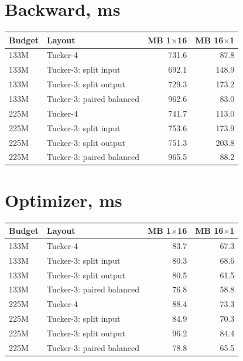 \documentclass[10pt]{article}
\begin{document}
\section{Backward, ms}
\begin{center}
\small
\begin{tabular}{llrr}
\toprule
\textbf{Budget} & \textbf{Layout} & \textbf{MB 1$\times$16} & \textbf{MB 16$\times$1} \\
\midrule
133M & Tucker-4 & 731.6 & 87.8 \\
133M & Tucker-3: split input & 692.1 & 148.9 \\
133M & Tucker-3: split output & 729.3 & 173.2 \\
133M & Tucker-3: paired balanced & 962.6 & 83.0 \\
225M & Tucker-4 & 741.7 & 113.0 \\
225M & Tucker-3: split input & 753.6 & 173.9 \\
225M & Tucker-3: split output & 751.3 & 203.8 \\
225M & Tucker-3: paired balanced & 965.5 & 88.2 \\
\bottomrule
\end{tabular}
\end{center}
\section{Optimizer, ms}
\begin{center}
\small
\begin{tabular}{llrr}
\toprule
\textbf{Budget} & \textbf{Layout} & \textbf{MB 1$\times$16} & \textbf{MB 16$\times$1} \\
\midrule
133M & Tucker-4 & 83.7 & 67.3 \\
133M & Tucker-3: split input & 80.3 & 68.6 \\
133M & Tucker-3: split output & 80.5 & 61.5 \\
133M & Tucker-3: paired balanced & 76.8 & 58.8 \\
225M & Tucker-4 & 88.4 & 73.3 \\
225M & Tucker-3: split input & 84.9 & 70.3 \\
225M & Tucker-3: split output & 96.2 & 84.4 \\
225M & Tucker-3: paired balanced & 78.8 & 65.5 \\
\bottomrule
\end{tabular}
\end{center}
\end{document}

